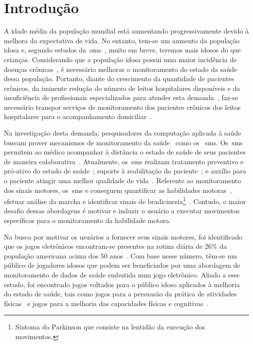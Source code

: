 \chapter{Introdu\c{c}\~{a}o} \label{chapter:intro}

A idade média da população mundial está aumentando progressivamente devido à melhora da expectativa de vida. No entanto, tem-se um aumento da população idosa e, segundo estudos da~\ac{oms}~\cite{ageing2011}, muito em breve, teremos mais idosos do que crianças. Considerando que a população idosa possui uma maior incidência de doenças crônicas~\cite{prevcronica2009}, é necessário melhorar o monitoramento do estado da saúde dessa população. Portanto, diante do crescimento da quantidade de pacientes crônicos, da iminente redução do número de leitos hospitalares disponíveis e da insuficiência de profissionais especializados para atender esta demanda~\cite{healthmonitoring2013}, faz-se necessário transpor serviços de monitoramento dos pacientes crônicos dos leitos hospitalares para o acompanhamento domiciliar~\cite{homecarebrazil2011}. 

Na investigação desta demanda, pesquisadores da computação aplicada à saúde buscam prover mecanismos de monitoramento da saúde~\cite{healthmonitoring2013,bardram2010,aarhus_negotiating_2010} como os ~\ac{sms}. Os~\ac{sms} permitem ao médico acompanhar à distância o estado de saúde de seus pacientes de maneira colaborativa~\cite{healthmonitoring2013}. Atualmente, os~\ac{sms} realizam tratamento preventivo e pró-ativo do estado de saúde~\cite{bardram2010}; suporte à reabilitação do paciente~\cite{sacbespoke2014}; e auxílio para o paciente atingir uma melhor qualidade de vida~\cite{sacsvmhms2014}. Referente ao monitoramento dos sinais motores, os~\ac{sms} e conseguem quantificar as habilidades motoras~\cite{manumeterjbhi2014,patel_monitoring_2009}, efetuar análise da marcha \cite{robotgait2014} e identificar sinais de bradicinesia\footnote{Sintoma do Parkinson que consiste na lentidão da execução dos movimentos.}~\cite{ambulatoryparkinson2010}. Contudo, o maior desafio dessas abordagens é motivar e induzir o usuário a executar movimentos específicos para o monitoramento da habilidade motora.

Na busca por motivar os usuários a fornecer seus sinais motores, foi identificado que os jogos eletrônicos encontram-se presentes na rotina diária de 26\% da população americana acima dos 50 anos~\cite{esa2016}. Com base nesse número, têm-se um público de jogadores idosos que podem ser beneficiados por uma abordagem de monitoramento de dados de saúde embutida num jogo eletrônico. Aliado a esse estudo, foi encontrado jogos voltados para o público idoso aplicados à melhoria do estado de saúde, tais como jogos para a persuasão da prática de atividades físicas~\cite{seriousgameolder2015} e jogos para a melhoria das capacidades físicas e cognitivas~\cite{arntzen2011}. 

